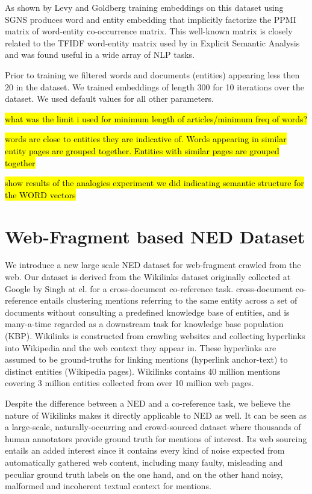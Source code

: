 \documentclass[11pt]{article}
\begin{document}
	As shown by Levy and Goldberg \cite{levy2014neural} training embeddings on this dataset using SGNS produces word and entity embedding that implicitly factorize the PPMI matrix of word-entity co-occurrence matrix. This well-known matrix is closely related to the TFIDF word-entity matrix used by \cite{gabrilovich2007computing} in Explicit Semantic Analysis and was found useful in a wide array of NLP tasks. 
	
	Prior to training we filtered words and documents (entities) appearing less then $20$ in the dataset. We trained embeddings of length 300 for 10 iterations over the dataset. We used default values for all other parameters.
	
	\hl{what was the limit i used for minimum length of articles/minimum freq of words?}
	
	\hl{words are close to entities they are indicative of. Words appearing in similar entity pages are grouped together. Entities with similar pages are grouped together}
	
	\hl{show results of the analogies experiment we did indicating semantic structure for the WORD vectors}
	
	\section{Web-Fragment based NED Dataset}
	We introduce a new large scale NED dataset for web-fragment crawled from the web. Our dataset is derived from the Wikilinks dataset originally collected at Google by Singh at el. \cite{singh12:wiki-links} for a cross-document co-reference task. cross-document co-reference entails clustering mentions referring to the same entity across a set of documents without consulting a predefined knowledge base of entities, and is many-a-time regarded as a downstream task for knowledge base population (KBP). Wikilinks is constructed from crawling websites and collecting hyperlinks into Wikipedia and the web context they appear in. These hyperlinks are assumed to be ground-truths for linking mentions (hyperlink anchor-text) to distinct entities (Wikipedia pages). Wikilinks contains 40 million mentions covering 3 million entities collected from over 10 million web pages.
	
	Despite the difference between a NED and a co-reference task, we believe the nature of Wikilinks makes it directly applicable to NED as well. It can be seen as a large-scale, naturally-occurring and crowd-sourced dataset where thousands of human annotators provide ground truth for mentions of interest. Its web sourcing entails an added interest since it contains every kind of noise expected from automatically gathered web content, including many faulty, misleading and peculiar ground truth labels on the one hand, and on the other hand noisy, malformed and incoherent textual context for mentions. 
	
\end{document}
